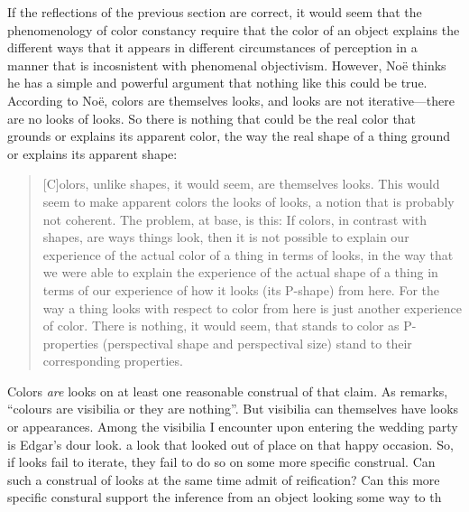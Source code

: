 \documentclass[12pt]{article}
\begin{document}
If the reflections of the previous section are correct, it would seem that the phenomenology of color constancy require that the color of an object explains the different ways that it appears in different circumstances of perception in a manner that is incosnistent with phenomenal objectivism. However, Noë thinks he has a simple and powerful argument that nothing like this could be true. According to Noë, colors are themselves looks, and looks are not iterative---there are no looks of looks. So there is nothing that could be the real color that grounds or explains its apparent color, the way the real shape of a thing ground or explains its apparent shape:
	\begin{quote}
		[C]olors, unlike shapes, it would seem, are themselves looks. This would seem to make apparent colors the looks of looks, a notion that is probably not coherent. The problem, at base, is this: If colors, in contrast with shapes, are ways things look, then it is not possible to explain our experience of the actual color of a thing in terms of looks, in the way that we were able to explain the experience of the actual shape of a thing in terms of our experience of how it looks (its P-shape) from here. For the way a thing looks with respect to color from here is just another experience of color. There is nothing, it would seem, that stands to color as P-properties (perspectival shape and perspectival size) stand to their corresponding properties. \citep[133]{Noe:2004fk}
	\end{quote}


Colors \emph{are} looks on at least one reasonable construal of that claim. As \citet[109]{Strawson:1966kx} remarks, ``colours are visibilia or they are nothing''. But visibilia can themselves have looks or appearances. Among the visibilia I encounter upon entering the wedding party is Edgar's dour look. a look that looked out of place on that happy occasion. So, if looks fail to iterate, they fail to do so on some more specific construal. Can such a construal of looks at the same time admit of reification? Can this more specific constural support the inference from an object looking some way to th
\end{document}
